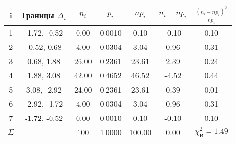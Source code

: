 \begin{tabular}{|c|c|c|c|c|c|c|}
\hline i & Границы $\Delta_i$ & $n_i$ & $p_i$ & $np_i$ & $n_i - np_i$ & $\frac{(n_i - np_i)^2}{np_i}$\\\hline
1 & -1.72, -0.52 & 0.00 & 0.0010 & 0.10 & -0.10 & 0.10\\
\hline
2 & -0.52, 0.68 & 4.00 & 0.0304 & 3.04 & 0.96 & 0.31\\
\hline
3 & 0.68, 1.88 & 26.00 & 0.2361 & 23.61 & 2.39 & 0.24\\
\hline
4 & 1.88, 3.08 & 42.00 & 0.4652 & 46.52 & -4.52 & 0.44\\
\hline
5 & 3.08, -2.92 & 24.00 & 0.2361 & 23.61 & 0.39 & 0.01\\
\hline
6 & -2.92, -1.72 & 4.00 & 0.0304 & 3.04 & 0.96 & 0.31\\
\hline
7 & -1.72, -0.52 & 0.00 & 0.0010 & 0.10 & -0.10 & 0.10\\
\hline
$\Sigma$ & & 100 & 1.0000 & 100.00 & 0.00 & $\chi_{\text{В}}^2=1.49$ \\
\hline
\end{tabular}

